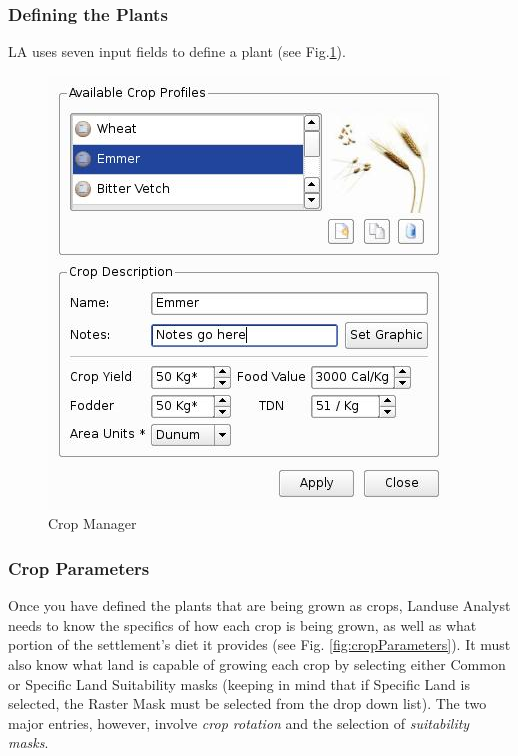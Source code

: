     \subsubsection{Defining the Plants}LA uses seven input fields to define a
      plant (see Fig.\ref{fig:cropManager}).

\begin{figure}[htbp]
  \includegraphics[scale=.6]{./images/cropManager.jpg}
  \caption{\label{fig:cropManager}Crop Manager}
\end{figure}

    \subsubsection{Crop Parameters}
    \label{cropParameters}
      Once you have defined the plants that are being grown as crops, Landuse
      Analyst needs to know the specifics of how each crop is being grown, as
      well as what portion of the settlement's diet it provides (see Fig.
      \ref{fig:cropParameters}).  It must also know what land is capable of
      growing each crop by selecting either Common or Specific Land Suitability masks
      (keeping in mind that if Specific Land is selected, the Raster Mask must
      be selected from the drop down list).  The two major entries, however,
      involve \textit{crop rotation} and the selection of \textit{suitability masks}.

